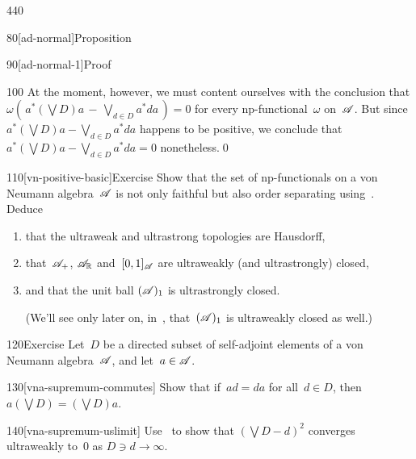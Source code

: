 \begin{parsec}{440}
\begin{point}{80}[ad-normal]{Proposition}
\begin{point}{90}[ad-normal-1]{Proof}
\begin{point}{100}
At the moment, however,
we must content ourselves with
the conclusion that
	$\omega(\,a^*(\bigvee D) a\,-\, \bigvee_{d\in D} a^* d a\,)=0$
for every np-functional~$\omega$ on~$\mathscr{A}$.
But since
	$a^*(\bigvee D) a - 
\bigvee_{d\in D} a^* da$
happens to be positive,
we conclude that
	$a^*(\bigvee D) a  
- \bigvee_{d\in D} a^* d a =0$
nonetheless.\qed
\end{point}
\end{point}
\end{point}
\begin{point}{110}[vn-positive-basic]{Exercise}%
Show that the set of np-functionals
on a von Neumann algebra~$\mathscr{A}$
is not only faithful 
but also order separating
using~.
Deduce
\begin{enumerate}%
\item%
%
that the ultraweak and ultrastrong topologies
are Hausdorff,
\item
that~$\mathscr{A}_+$, 
$\mathscr{A}_{\mathbb{R}}$ and~$[0,1]_{\mathscr{A}}$  are ultraweakly 
(and ultrastrongly) closed, 
\item
and that the unit ball
$(\mathscr{A})_1$
is ultrastrongly closed.

(We'll see only later on, in~,
that~$(\mathscr{A})_1$
is ultraweakly closed as well.)
\end{enumerate}
\end{point}
\begin{point}{120}{Exercise}%
Let~$D$ be a directed subset of self-adjoint elements
of a von Neumann algebra~$\mathscr{A}$,
and let~$a\in\mathscr{A}$.
\begin{point}{130}[vna-supremum-commutes]%
Show that if~$ad=da$ for all~$d\in D$,
then $a(\bigvee D) = (\bigvee D)a $.
\end{point}
\begin{point}{140}[vna-supremum-uslimit]%
Use~
to show that $(\bigvee D-d)^2$ converges ultraweakly to~$0$
as $D\ni d\to\infty$.


\end{point}
\end{point}
\end{parsec}
